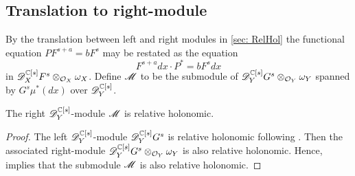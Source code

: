  \subsection{Translation to right-module}
 By the translation between left and right modules in \cref{sec: RelHol} the functional equation $P F^{s+a} = b F^s$ may be restated as the equation
 $$F^{s+a}dx \cdot P^* = b F^s dx $$
 in $\mathscr{D}_X^{\mathbb{C}[s]} F^s \otimes_{\mathcal{O}_X}\omega_X$.
 Define $\mathscr{M}$ to be the submodule of $\mathscr{D}_Y^{\mathbb{C}[s]} G^s\otimes_{\mathcal{O}_Y}\omega_Y$ spanned by $G^s \mu^*(dx)$ over $\mathscr{D}_Y^{\mathbb{C}[s]}$.
 \begin{lemma}
   The right $\mathscr{D}_Y^{\mathbb{C}[s]}$-module $\mathscr{M}$ is relative holonomic.
 \end{lemma}
 \begin{proof}
   The left $\mathscr{D}_Y^{\mathbb{C}[s]}$-module $\mathscr{D}_Y^{\mathbb{C}[s]}G^s$ is relative holonomic following \cite[Result 1]{maisonobe2016filtration}.
   Then the associated right-module $\mathscr{D}_Y^{\mathbb{C}[s]}G^s\otimes_{\mathcal{O}_Y} \omega_Y$ is also relative holonomic.
   Hence,  implies that the submodule $\mathscr{M}$ is also relative holonomic.
 \end{proof}
